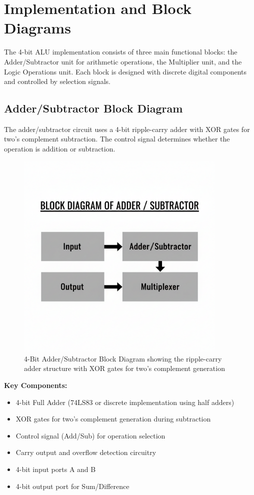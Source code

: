 \chapter{Implementation and Block Diagrams}

The 4-bit ALU implementation consists of three main functional blocks: the Adder/Subtractor unit for arithmetic operations, the Multiplier unit, and the Logic Operations unit. Each block is designed with discrete digital components and controlled by selection signals.

\section{Adder/Subtractor Block Diagram}

The adder/subtractor circuit uses a 4-bit ripple-carry adder with XOR gates for two's complement subtraction. The control signal determines whether the operation is addition or subtraction.

\begin{figure}[h]
    \centering
    \includegraphics[width=0.9\textwidth]{adder-substractor}
    \caption{4-Bit Adder/Subtractor Block Diagram showing the ripple-carry adder structure with XOR gates for two's complement generation}
    \label{fig:adder-subtractor}
\end{figure}

\textbf{Key Components:}
\begin{itemize}
    \item 4-bit Full Adder (74LS83 or discrete implementation using half adders)
    \item XOR gates for two's complement generation during subtraction
    \item Control signal (Add/Sub) for operation selection
    \item Carry output and overflow detection circuitry
    \item 4-bit input ports A and B
    \item 4-bit output port for Sum/Difference
\end{itemize}

